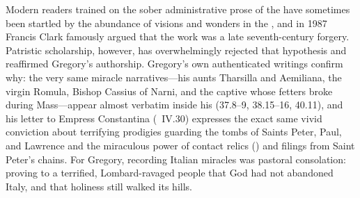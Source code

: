 Modern readers trained on the sober administrative prose of the
 have sometimes been startled by the abundance of visions and
wonders in the , and in 1987 Francis Clark famously argued that
the work was a late seventh-century forgery. Patristic scholarship, however,
has overwhelmingly rejected that hypothesis and reaffirmed Gregory's
authorship. Gregory's own authenticated writings confirm why: the very same
miracle narratives---his aunts Tharsilla and Aemiliana, the virgin Romula,
Bishop Cassius of Narni, and the captive whose fetters broke during
Mass---appear almost verbatim inside his 
(37.8--9, 38.15--16, 40.11), and his letter to Empress Constantina (\
IV.30) expresses the exact same vivid conviction about terrifying prodigies
guarding the tombs of Saints Peter, Paul, and Lawrence and the miraculous power
of contact relics (\latin{brandea}) and filings from Saint Peter's chains. For
Gregory, recording Italian miracles was pastoral consolation: proving to a
terrified, Lombard-ravaged people that God had not abandoned Italy, and that
holiness still walked its hills.
